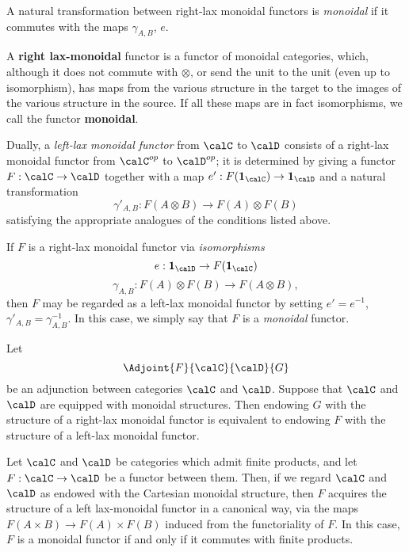 \begin{CategoryTheory}
\begin{definition}
A natural transformation between right-lax monoidal functors is {\it monoidal} if it commutes with
the maps $\gamma_{A,B}$, $e$.
\end{definition}
\begin{shaded}
A \textbf{right lax-monoidal} functor is a functor of monoidal categories, which, although it does not commute with $\otimes$, or send the unit to the unit (even up to isomorphism), has maps from the various structure in the target to the images of the various structure in the source. If all these maps are in fact isomorphisms, we call the functor \textbf{monoidal}.
\end{shaded}


Dually, a {\it left-lax monoidal functor} from $\calC$ to $\calD$ consists of a right-lax monoidal functor from $\calC^{op}$ to $\calD^{op}$; it is determined by giving a functor
$F: \calC \rightarrow \calD$ together with a map $e': F( {\bf 1_{\calC}}) \rightarrow {\bf 1}_{\calD}$
and a natural transformation
$$ \gamma'_{A,B}: F(A \otimes B) \rightarrow F(A) \otimes F(B)$$
satisfying the appropriate analogues of the conditions listed above.

If $F$ is a right-lax monoidal functor via {\em isomorphisms}
$$ e: {\bf 1}_{\calD} \rightarrow F( { \bf 1_{\calC} })$$
$$ \gamma_{A,B}: F(A) \otimes F(B) \rightarrow F(A \otimes B),$$
then $F$ may be regarded as a left-lax monoidal functor by setting $e' = e^{-1}$,
$\gamma'_{A,B} = \gamma_{A,B}^{-1}$. In this case, we simply say that $F$ is a {\em monoidal} functor.

\begin{remark}
Let 
$$ \Adjoint{F}{\calC}{\calD}{G}$$ be an adjunction between categories $\calC$ and $\calD$. Suppose that $\calC$ and $\calD$ are equipped with monoidal structures. Then endowing $G$ with the structure of a right-lax monoidal functor is equivalent to endowing $F$ with the structure of a left-lax monoidal functor.
\end{remark}

\begin{example}
Let $\calC$ and $\calD$ be categories which admit finite products, and let
$F: \calC \rightarrow \calD$ be a functor between them. Then, if we regard $\calC$ and
$\calD$ as endowed with the Cartesian monoidal structure, then $F$ acquires the structure
of a left lax-monoidal functor in a canonical way, via the maps
$F(A \times B) \rightarrow F(A) \times F(B)$ induced from the functoriality of $F$. In this case,
$F$ is a monoidal functor if and only if it commutes with finite products.
\end{example}


\end{CategoryTheory}
